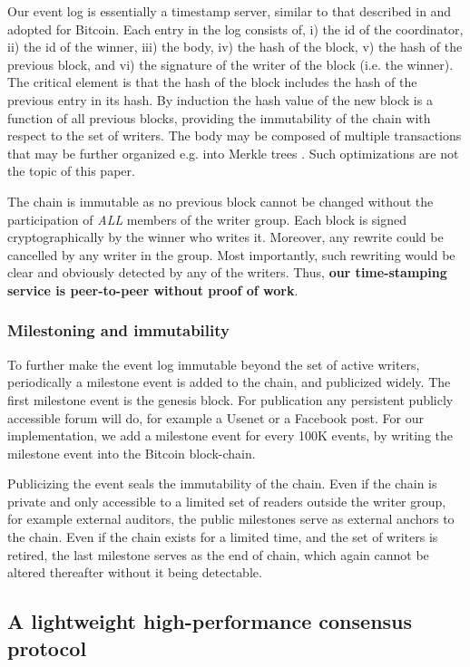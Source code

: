 \documentclass[10pt]{article}
\begin{document}
Our event log is essentially a timestamp server, similar to that described in \cite{massias} and adopted for Bitcoin. Each entry in the log consists of, i) the id of the coordinator, ii) the id of the winner, iii) the body, iv) the hash of the block, v) the hash of the previous block, and vi) the signature of the writer of the block (i.e. the winner).
The critical element is that the hash of the block includes the hash of the previous entry in its hash. By induction the hash value of the new block is a function of all previous blocks, providing the immutability of the chain with respect to the set of writers. The body may be composed of multiple transactions that may be further organized e.g. into Merkle trees \cite{Mercle1980}.
Such optimizations are not the topic of this paper.

The chain is immutable as no previous block cannot be changed without the participation of \emph{ALL} members of the writer group. Each block is signed cryptographically by the winner who writes it. Moreover, any rewrite could be cancelled by any writer in the group. Most importantly, such rewriting would be clear and obviously detected by any of the writers. Thus, %
\textbf{our time-stamping service is peer-to-peer without proof of work}. 


\subsubsection*{Milestoning and immutability}
To further make the event log immutable beyond the set of active writers, periodically a milestone event is added to the chain, and publicized widely. The first milestone event is the genesis block. For publication any persistent publicly accessible forum will do, for example a Usenet or a Facebook post. For our implementation, we add a milestone event for every 100K events, by writing the milestone event into the Bitcoin block-chain. 

Publicizing the event seals the immutability of the chain. Even if the chain is private and only accessible to a limited set of readers outside the writer group, for example external auditors, the public milestones serve as external anchors to the chain. Even if the chain exists for a limited time, and the set of writers is retired, the last milestone serves as the end of chain, which again cannot be altered thereafter without it being detectable.

\subsection{A lightweight high-performance consensus protocol}
\end{document}
